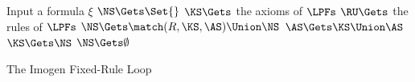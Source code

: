 
\begin{algorithm}
  \begin{algorithmic}[1]
    \STATE Input a formula $\xi$
    \STATE $\NS \Gets \Set{}$
    \STATE $\KS \Gets $ the axioms of $\LPFs$
    \STATE $\RU \Gets $ the rules of $\LPFs$
    \WHILE{$\KS \neq \Set{}$} \label{ruleloop:while}
    \STATE $\NS \Gets \match(R, \KS, \AS) \Union \NS$
    \ENDFOR
    \PRINT {}
    \RETURN
    \ENDIF
    \STATE $\AS \Gets \KS \Union \AS$
    \STATE $\KS \Gets \NS$
    \STATE $\NS \Gets \emptyset$
    \ENDWHILE
    \PRINT {}
    \RETURN
  \end{algorithmic}
  \caption{The Imogen Fixed-Rule Loop}
  \label{inverse:algorithm:fixed}
\end{algorithm}

